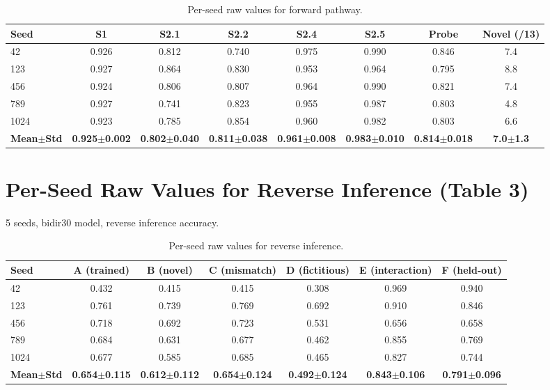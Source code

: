 \documentclass{article}
\begin{document}
\begin{table}[htbp]
\centering
\small
\caption{Per-seed raw values for forward pathway.}
\label{tab:forward_raw}
\begin{tabular}{lccccccc}
\toprule
Seed & S1 & S2.1 & S2.2 & S2.4 & S2.5 & Probe & Novel (/13) \\
\midrule
42 & 0.926 & 0.812 & 0.740 & 0.975 & 0.990 & 0.846 & 7.4 \\
123 & 0.927 & 0.864 & 0.830 & 0.953 & 0.964 & 0.795 & 8.8 \\
456 & 0.924 & 0.806 & 0.807 & 0.964 & 0.990 & 0.821 & 7.4 \\
789 & 0.927 & 0.741 & 0.823 & 0.955 & 0.987 & 0.803 & 4.8 \\
1024 & 0.923 & 0.785 & 0.854 & 0.960 & 0.982 & 0.803 & 6.6 \\
\midrule
\textbf{Mean$\pm$Std} & \textbf{0.925$\pm$0.002} & \textbf{0.802$\pm$0.040} & \textbf{0.811$\pm$0.038} & \textbf{0.961$\pm$0.008} & \textbf{0.983$\pm$0.010} & \textbf{0.814$\pm$0.018} & \textbf{7.0$\pm$1.3} \\
\bottomrule
\end{tabular}
\end{table}

\section{Per-Seed Raw Values for Reverse Inference (Table 3)}

5 seeds, bidir30 model, reverse inference accuracy.

\begin{table}[htbp]
\centering
\small
\caption{Per-seed raw values for reverse inference.}
\label{tab:reverse_raw}
\begin{tabular}{lcccccc}
\toprule
Seed & A (trained) & B (novel) & C (mismatch) & D (fictitious) & E (interaction) & F (held-out) \\
\midrule
42 & 0.432 & 0.415 & 0.415 & 0.308 & 0.969 & 0.940 \\
123 & 0.761 & 0.739 & 0.769 & 0.692 & 0.910 & 0.846 \\
456 & 0.718 & 0.692 & 0.723 & 0.531 & 0.656 & 0.658 \\
789 & 0.684 & 0.631 & 0.677 & 0.462 & 0.855 & 0.769 \\
1024 & 0.677 & 0.585 & 0.685 & 0.465 & 0.827 & 0.744 \\
\midrule
\textbf{Mean$\pm$Std} & \textbf{0.654$\pm$0.115} & \textbf{0.612$\pm$0.112} & \textbf{0.654$\pm$0.124} & \textbf{0.492$\pm$0.124} & \textbf{0.843$\pm$0.106} & \textbf{0.791$\pm$0.096} \\
\bottomrule
\end{tabular}
\end{table}
\end{document}

